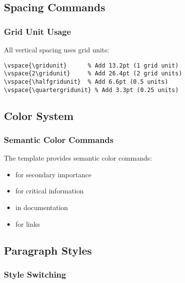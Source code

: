 \subsection{Spacing Commands}

\subsubsection{Grid Unit Usage}

All vertical spacing uses grid units:

\begin{verbatim}
\vspace{\gridunit}      % Add 13.2pt (1 grid unit)
\vspace{2\gridunit}     % Add 26.4pt (2 grid units)
\vspace{\halfgridunit}  % Add 6.6pt (0.5 units)
\vspace{\quartergridunit} % Add 3.3pt (0.25 units)
\end{verbatim}

\subsection{Color System}

\subsubsection{Semantic Color Commands}

The template provides semantic color commands:

\begin{itemize}
\item {} for secondary importance
\item {} for critical information
\item {} in documentation
\item {} for links
\end{itemize}

\subsection{Paragraph Styles}

\subsubsection{Style Switching}

